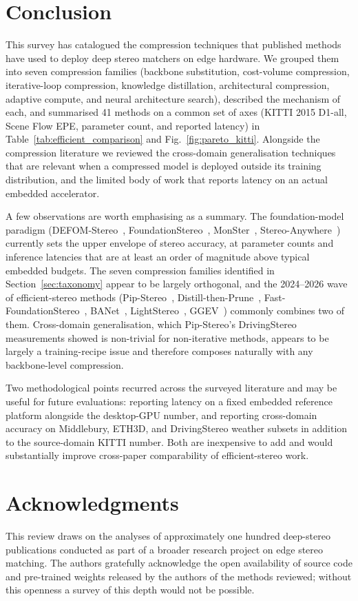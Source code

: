 \section{Conclusion}
\label{sec:conclusion}

This survey has catalogued the compression techniques that published methods have used to deploy deep stereo matchers on edge hardware. We grouped them into seven compression families (backbone substitution, cost-volume compression, iterative-loop compression, knowledge distillation, architectural compression, adaptive compute, and neural architecture search), described the mechanism of each, and summarised 41 methods on a common set of axes (KITTI 2015 D1-all, Scene Flow EPE, parameter count, and reported latency) in Table~\ref{tab:efficient_comparison} and Fig.~\ref{fig:pareto_kitti}. Alongside the compression literature we reviewed the cross-domain generalisation techniques that are relevant when a compressed model is deployed outside its training distribution, and the limited body of work that reports latency on an actual embedded accelerator.

A few observations are worth emphasising as a summary. The foundation-model paradigm (DEFOM-Stereo~\cite{jiang2025defom}, FoundationStereo~\cite{wen2025foundationstereo}, MonSter~\cite{cheng2025monster}, Stereo-Anywhere~\cite{bartolomei2025stereoanywhere}) currently sets the upper envelope of stereo accuracy, at parameter counts and inference latencies that are at least an order of magnitude above typical embedded budgets. The seven compression families identified in Section~\ref{sec:taxonomy} appear to be largely orthogonal, and the 2024--2026 wave of efficient-stereo methods (Pip-Stereo~\cite{zheng2026pipstereo}, Distill-then-Prune~\cite{pan2024dtp}, Fast-FoundationStereo~\cite{wen2026fastfoundationstereo}, BANet~\cite{xu2025banet}, LightStereo~\cite{guo2025lightstereo}, GGEV~\cite{liu2026ggev}) commonly combines two of them. Cross-domain generalisation, which Pip-Stereo's DrivingStereo measurements showed is non-trivial for non-iterative methods, appears to be largely a training-recipe issue and therefore composes naturally with any backbone-level compression.

Two methodological points recurred across the surveyed literature and may be useful for future evaluations: reporting latency on a fixed embedded reference platform alongside the desktop-GPU number, and reporting cross-domain accuracy on Middlebury, ETH3D, and DrivingStereo weather subsets in addition to the source-domain KITTI number. Both are inexpensive to add and would substantially improve cross-paper comparability of efficient-stereo work.

\section*{Acknowledgments}
This review draws on the analyses of approximately one hundred deep-stereo publications conducted as part of a broader research project on edge stereo matching. The authors gratefully acknowledge the open availability of source code and pre-trained weights released by the authors of the methods reviewed; without this openness a survey of this depth would not be possible.
